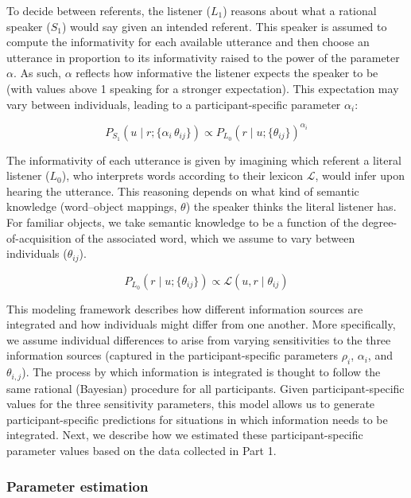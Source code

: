 \documentclass[
  man,floatsintext]{apa6}
\begin{document}
To decide between referents, the listener (\(L_1\)) reasons about what a rational speaker (\(S_1\)) would say given an intended referent. This speaker is assumed to compute the informativity for each available utterance and then choose an utterance in proportion to its informativity raised to the power of the parameter \(\alpha\). As such, \(\alpha\) reflects how informative the listener expects the speaker to be (with values above 1 speaking for a stronger expectation). This expectation may vary between individuals, leading to a participant-specific parameter \(\alpha_i\):

\begin{equation}
P_{S_1}(u \mid r; \{\alpha_i\, \theta_{ij}\})\propto P_{L_0}(r \mid u; \{\theta_{ij}\}) ^{\alpha_i}
\label{eq:rsafull2}
\end{equation}

The informativity of each utterance is given by imagining which referent a literal listener (\(L_0\)), who interprets words according to their lexicon \(\mathcal{L}\), would infer upon hearing the utterance. This reasoning depends on what kind of semantic knowledge (word--object mappings, \(\theta\)) the speaker thinks the literal listener has. For familiar objects, we take semantic knowledge to be a function of the degree-of-acquisition of the associated word, which we assume to vary between individuals (\(\theta_{ij}\)).

\begin{equation}
P_{L_0}(r \mid u; \{\theta_{ij}\}) \propto \mathcal{L}(u, r \mid \theta_{ij})
\label{eq:rsafull3}
\end{equation}

This modeling framework describes how different information sources are integrated and how individuals might differ from one another. More specifically, we assume individual differences to arise from varying sensitivities to the three information sources (captured in the participant-specific parameters \(\rho_i\), \(\alpha_i\), and \(\theta_{i,j}\)). The process by which information is integrated is thought to follow the same rational (Bayesian) procedure for all participants. Given participant-specific values for the three sensitivity parameters, this model allows us to generate participant-specific predictions for situations in which information needs to be integrated. Next, we describe how we estimated these participant-specific parameter values based on the data collected in Part 1.

\hypertarget{parameter-estimation}{%
\subsubsection{Parameter estimation}\label{parameter-estimation}}
\end{document}
